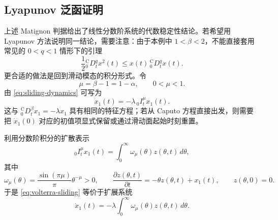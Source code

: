 \documentclass[UTF8,a4paper,11pt]{ctexart}
\begin{document}
\subsection{Lyapunov 泛函证明}

上述 Matignon 判据给出了线性分数阶系统的代数稳定性结论。若希望用
Lyapunov 方法说明同一结论，需要注意：由于本例中
$1<\beta<2$，不能直接套用常见的 $0<q<1$ 情形下的引理
\[
  \frac{1}{2}{}_0^{\mathrm{C}}D_t^q x^2(t)
  \le
  x(t)\,{}_0^{\mathrm{C}}D_t^q x(t).
\]
更合适的做法是回到滑动模态的积分形式。令
\begin{equation}
  \mu=\beta-1=1-\alpha,\qquad 0<\mu<1.
\end{equation}
由 \eqref{eq:sliding-dynamics} 可写为
\begin{equation}
  \dot{x}_1(t)
  =
  -\lambda\,{}_0 I_t^\mu x_1(t).
  \label{eq:volterra-sliding}
\end{equation}
这与
${}_0^{\mathrm{C}}D_t^\beta x_1=-\lambda x_1$
具有相同的特征方程；若从 Caputo 方程直接出发，则需要把
$\dot{x}_1(0)$ 对应的初值项显式保留或通过滑动面起始时刻重置。

利用分数阶积分的扩散表示
\begin{equation}
  {}_0 I_t^\mu x_1(t)
  =
  \int_0^\infty \omega_\mu(\theta) z(\theta,t)\,d\theta,
  \label{eq:diffusive-integral}
\end{equation}
其中
\begin{equation}
  \omega_\mu(\theta)
  =
  \frac{\sin(\pi\mu)}{\pi}\theta^{-\mu}>0,
  \qquad
  \frac{\partial z(\theta,t)}{\partial t}
  =
  -\theta z(\theta,t)+x_1(t),
  \qquad z(\theta,0)=0.
\end{equation}
于是 \eqref{eq:volterra-sliding} 等价于扩展系统
\begin{equation}
  \dot{x}_1(t)
  =
  -\lambda
  \int_0^\infty \omega_\mu(\theta) z(\theta,t)\,d\theta.
  \label{eq:diffusive-system}
\end{equation}
\end{document}
